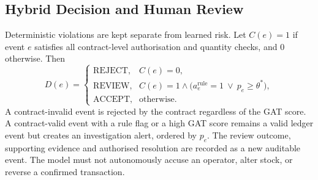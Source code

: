 \documentclass[conference,a4paper]{IEEEtran}
\begin{document}
\subsection{Hybrid Decision and Human Review}
Deterministic violations are kept separate from learned risk. Let $C(e)=1$ if event $e$ satisfies all contract-level authorisation and quantity checks, and $0$ otherwise. Then
\begin{equation}
D(e)=\begin{cases}
\text{REJECT}, & C(e)=0,\\
\text{REVIEW}, & C(e)=1\wedge\big(a^{\mathrm{rule}}_e=1\ \vee\ p_e\ge\theta^{*}\big),\\
\text{ACCEPT}, & \text{otherwise.}
\end{cases}
\label{eq:decision}
\end{equation}
A contract-invalid event is rejected by the contract regardless of the GAT score. A contract-valid event with a rule flag or a high GAT score remains a valid ledger event but creates an investigation alert, ordered by $p_e$. The review outcome, supporting evidence and authorised resolution are recorded as a new auditable event. The model must not autonomously accuse an operator, alter stock, or reverse a confirmed transaction.
\end{document}
